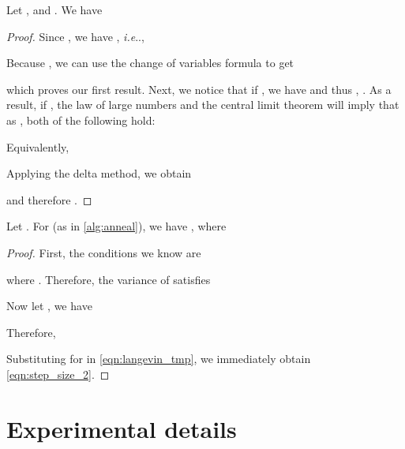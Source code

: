 \documentclass{article}
\makeatletter
\newenvironment{customprop}[1]
{\renewcommand\theinnercustomprop{#1}\innercustomprop}
{\endinnercustomprop}
\def\@onedot{\ifx\@let@token.\else.\null\fi\xspace}
\DeclareRobustCommand\onedot{\futurelet\@let@token\@onedot}
\def\ie{\emph{i.e}\onedot}
\makeatother
\begin{document}
\begin{customprop}{\ref{prop:noise_levels}}
Let , and . We have

\end{customprop}
\begin{proof}
Since , we have , \ie,

Because , we can use the change of variables formula to get

which proves our first result. Next, we notice that if , we have  and thus , .
As a result, if , the law of large numbers and the central limit theorem will imply that as , both of the following hold:

Equivalently,

Applying the delta method, we obtain

and therefore .
\end{proof}

\begin{customprop}{\ref{prop:langevin}}
Let . For  (as in \cref{alg:anneal}), we have , where

\end{customprop}

\begin{proof}
First, the conditions we know are

where . Therefore, the variance of  satisfies

Now let , we have

Therefore,

Substituting  for  in \cref{eqn:langevin_tmp}, we immediately obtain \cref{eqn:step_size_2}.
\end{proof}

\section{Experimental details}\label{app:exp_details}
\end{document}
